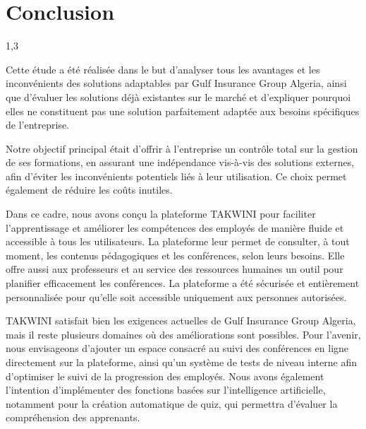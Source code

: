\documentclass{article}
\begin{document}
\newpage
\section{Conclusion}
\begin{spacing}{1,3}
    


\vspace{0,5cm}

Cette étude a été réalisée dans le but d’analyser tous les avantages et les inconvénients des solutions adaptables par Gulf Insurance Group Algeria, ainsi que d’évaluer les solutions déjà existantes sur le marché et d’expliquer pourquoi elles ne constituent pas une solution parfaitement adaptée aux besoins spécifiques de l’entreprise.

\vspace{1cm}


Notre objectif principal était d’offrir à l’entreprise un contrôle total sur la gestion de ses formations, en assurant une indépendance vis-à-vis des solutions externes, afin d’éviter les inconvénients potentiels liés à leur utilisation. Ce choix permet également de réduire les coûts inutiles.

\vspace{1cm}


Dans ce cadre, nous avons conçu la plateforme TAKWINI pour faciliter l’apprentissage et améliorer les compétences des employés de manière fluide et accessible à tous les utilisateurs. La plateforme leur permet de consulter, à tout moment, les contenus pédagogiques et les conférences, selon leurs besoins. Elle offre aussi aux professeurs et au service des ressources humaines un outil pour planifier efficacement les conférences. La plateforme a été sécurisée et entièrement personnalisée pour qu’elle soit accessible uniquement aux personnes autorisées.




\vspace{1cm}



TAKWINI satisfait bien les exigences actuelles de Gulf Insurance Group Algeria, mais il reste plusieurs domaines où des améliorations sont possibles. Pour l'avenir, nous envisageons d'ajouter un espace consacré au suivi des conférences en ligne directement sur la plateforme, ainsi qu'un système de tests de niveau interne afin d’optimiser le suivi de la progression des employés. Nous avons également l'intention d'implémenter des fonctions basées sur l'intelligence artificielle, notamment pour la création automatique de quiz, qui permettra d’évaluer la compréhension des apprenants.
\end{spacing}
\end{document}
